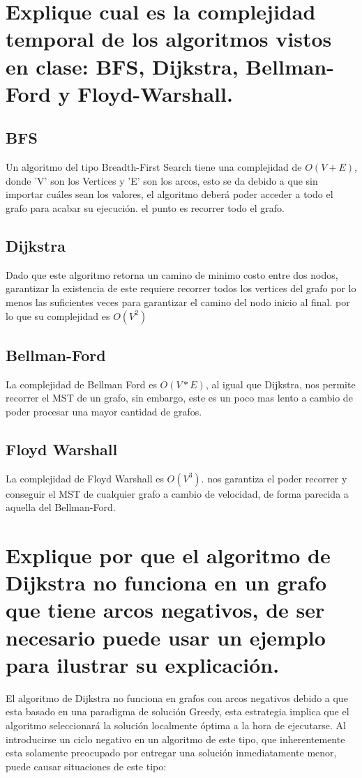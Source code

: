 \documentclass[a4paper]{article}
\begin{document}
\section{Explique cual es la complejidad temporal de los algoritmos vistos en clase: BFS,
Dijkstra, Bellman-Ford y Floyd-Warshall.}
\subsection{BFS}
Un algoritmo del tipo Breadth-First Search tiene una complejidad de $O(V+E)$, donde
'V' son los Vertices y 'E' son los arcos, esto se da debido a que sin importar cuáles
sean los valores, el algoritmo deberá poder acceder a todo el grafo para acabar su
ejecución. el punto es recorrer todo el grafo.

\subsection{Dijkstra}
Dado que este algoritmo retorna un camino de minimo costo entre dos nodos, garantizar
la existencia de este requiere recorrer todos los vertices del grafo por lo menos las
suficientes veces para garantizar el camino del nodo inicio al final. por lo que su complejidad es
$O(V^2)$

\subsection{Bellman-Ford}
La complejidad de Bellman Ford es $O(V*E)$, al igual que Dijkstra, nos permite recorrer
el MST de un grafo, sin embargo, este es un poco mas lento a cambio de poder procesar una
mayor cantidad de grafos. 

\subsection{Floyd Warshall}
La complejidad de Floyd Warshall es $O(V^3)$. nos garantiza el poder recorrer y conseguir
el MST de cualquier grafo a cambio de velocidad, de forma parecida a aquella del
Bellman-Ford.


\section{Explique por que el algoritmo de Dijkstra no funciona en un grafo que tiene arcos
negativos, de ser necesario puede usar un ejemplo para ilustrar su explicación.}

El algoritmo de Dijkstra no funciona en grafos con arcos negativos debido a que 
esta basado en una paradigma de solución Greedy, esta estrategia implica que el algoritmo
seleccionará la solución localmente óptima a la hora de ejecutarse. Al introducirse un ciclo negativo
en un algoritmo de este tipo, que inherentemente esta solamente preocupado por entregar una solución
inmediatamente menor, puede causar situaciones de este tipo:
    
\end{document}

